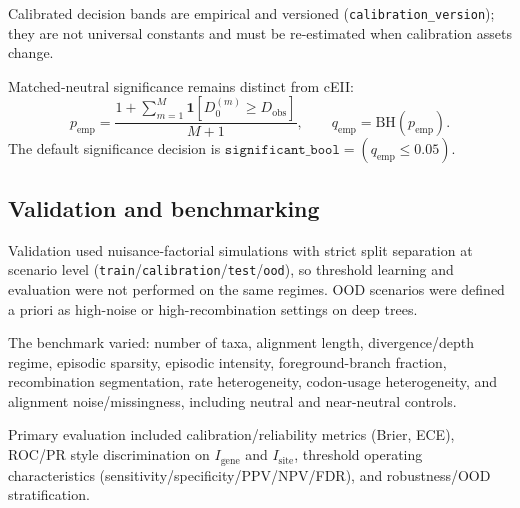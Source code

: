 \documentclass[11pt]{article}
\begin{document}
Calibrated decision bands are empirical and versioned (\texttt{calibration\_version}); they are not universal constants and must be re-estimated when calibration assets change.

Matched-neutral significance remains distinct from cEII:
\[
p_{\mathrm{emp}}=\frac{1+\sum_{m=1}^{M}\mathbf{1}\!\left[D_0^{(m)}\ge D_{\mathrm{obs}}\right]}{M+1},\qquad
q_{\mathrm{emp}}=\mathrm{BH}(p_{\mathrm{emp}}).
\]
The default significance decision is $\texttt{significant\_bool}=(q_{\mathrm{emp}}\le 0.05)$.

\subsection{Validation and benchmarking}

Validation used nuisance-factorial simulations with strict split separation at scenario level (\texttt{train}/\texttt{calibration}/\texttt{test}/\texttt{ood}), so threshold learning and evaluation were not performed on the same regimes. OOD scenarios were defined a priori as high-noise or high-recombination settings on deep trees.

The benchmark varied: number of taxa, alignment length, divergence/depth regime, episodic sparsity, episodic intensity, foreground-branch fraction, recombination segmentation, rate heterogeneity, codon-usage heterogeneity, and alignment noise/missingness, including neutral and near-neutral controls.

Primary evaluation included calibration/reliability metrics (Brier, ECE), ROC/PR style discrimination on $I_{\mathrm{gene}}$ and $I_{\mathrm{site}}$, threshold operating characteristics (sensitivity/specificity/PPV/NPV/FDR), and robustness/OOD stratification.
\end{document}
